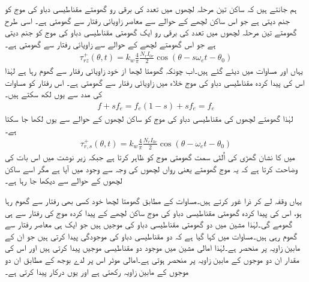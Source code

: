 ہم جانتے ہیں کہ ساکن تین مرحلہ لچھوں میں  تعدد کی برقی رو   گھومتے مقناطیسی دباو کی موج کو جنم دیتی ہے جو اس ساکن لچھے کے حوالے سے   معاصر زاویائی رفتار سے گھومتی ہے۔ اسی طرح گھومتے تین مرحلہ لچھوں میں  تعدد کی برقی رو ایک گھومتی مقناطیسی دباو کی موج  کو جنم دیتی ہے جو اس گھومتے لچھے کے حوالے سے   زاویائی رفتار سے گھومتی ہے۔
\begin{align}
\tau_{rz}^+(\theta,t)=k_w \frac{4}{\pi} \frac{N_r I_{0r}}{2} \cos \left(\theta-s \omega_e t -\theta_0 \right)
\end{align}
یہاں   اور  مساوات  میں دیئے گئے ہیں۔اب چونکہ گھومتا لچھا از خود  زاویائی رفتار سے گھوم رہا ہے لہٰذا اس کی پیدا کردہ مقناطیسی دباو کی موج خلاء میں  زاویائی رفتار سے گھومتی ہے۔ اس رفتار کو مساوات   کی مدد سے یوں لکھ سکتے ہیں۔
\begin{align}
f+s f_e= f_e (1-s)+ s f_e=f_e
\end{align}
لہٰذا گھومتے لچھوں کی مقناطیسی دباو کی موج کو ساکن لچھوں کے حوالے سے یوں لکھا جا سکتا ہے۔
\begin{align}\label{مساوات_امالی_گھومتے_حصے_کی_موج}
\tau_{r,s}^+(\theta,t)=k_w \frac{4}{\pi} \frac{N_r I_{0r}}{2} \cos \left(\theta-\omega_e t -\theta_0 \right)
\end{align}
 میں  کا نشان گھڑی کی اُلٹی سمت گھومتی موج کو ظاہر کرتا ہے جبکہ زیر نوشت  میں  اس بات کی وضاحت کرتا ہے کہ یہ موج گھومتے یعنی رواں لچھوں کی وجہ سے وجود میں آیا ہے مگر اسے ساکن لچھوں کے حوالے سے دیکھا جا رہا ہے۔

یہاں وقفہ لے کر ذرا غور کرتے ہیں۔مساوات   کے مطابق گھومتا لچھا خود کسی بھی رفتار سے گھوم رہا ہو، اس کی پیدا کردہ گھومتی مقناطیسی دباو کی موج ساکن لچھے کے پیدا کردہ موج کی رفتار سے ہی گھومے گی۔لہٰذا مشین میں دو گھومتی مقناطیسی دباو کی موجیں ہیں جو ایک ہی معاصر رفتار سے گھوم رہی ہیں۔مساوات   میں کہا گیا ہے کہ دو مقناطیسی دباو کی موجودگی  پیدا کرتی ہیں جو ان کے مابین زاویہ پر منحصر ہے۔لہٰذا امالی مشین میں موجود دو مقناطیسی موجیں  پیدا کرتی ہیں اور اس  کی مقدار ان دو موجوں کے مابین زاویہ پر منحصر ہوتی ہے۔امالی موٹر اس پر لدے بوجھ کے مطابق ان دو موجوں کے مابین زاویہ رکھتی ہے اور یوں درکار  پیدا کرتی ہے۔

